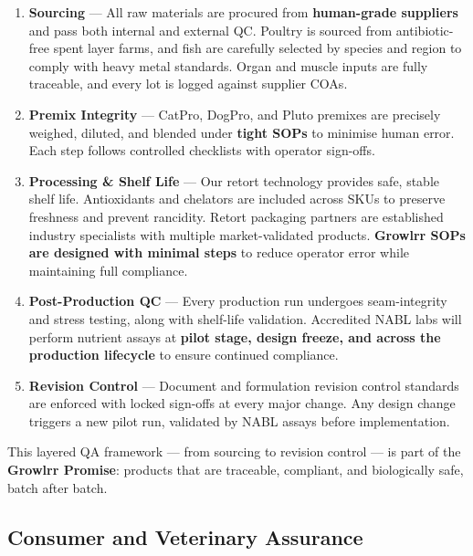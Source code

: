 \begin{enumerate}[leftmargin=1.5em]
\item \textbf{Sourcing} --- All raw materials are procured from \textbf{human-grade suppliers}\cite{ref8} and pass both internal and external QC. Poultry is sourced from antibiotic-free spent layer farms, and fish are carefully selected by species and region to comply with heavy metal standards. Organ and muscle inputs are fully traceable, and every lot is logged against supplier COAs\cite{ref14}.

\item \textbf{Premix Integrity} --- CatPro, DogPro, and Pluto premixes are precisely weighed, diluted, and blended under \textbf{tight SOPs} to minimise human error. Each step follows controlled checklists with operator sign-offs.

\item \textbf{Processing \& Shelf Life} --- Our retort technology provides safe, stable shelf life. Antioxidants and chelators are included across SKUs to preserve freshness and prevent rancidity. Retort packaging partners are established industry specialists with multiple market-validated products. \textbf{Growlrr SOPs are designed with minimal steps} to reduce operator error while maintaining full compliance.

\item \textbf{Post-Production QC} --- Every production run undergoes seam-integrity and stress testing, along with shelf-life validation. Accredited NABL labs will perform nutrient assays at \textbf{pilot stage, design freeze, and across the production lifecycle} to ensure continued compliance.

\item \textbf{Revision Control} --- Document and formulation revision control standards are enforced with locked sign-offs at every major change. Any design change triggers a new pilot run, validated by NABL assays before implementation.
\end{enumerate}

This layered QA framework --- from sourcing to revision control --- is part of the \textbf{Growlrr Promise}: products that are traceable, compliant, and biologically safe, batch after batch.

\subsection*{Consumer and Veterinary Assurance}

